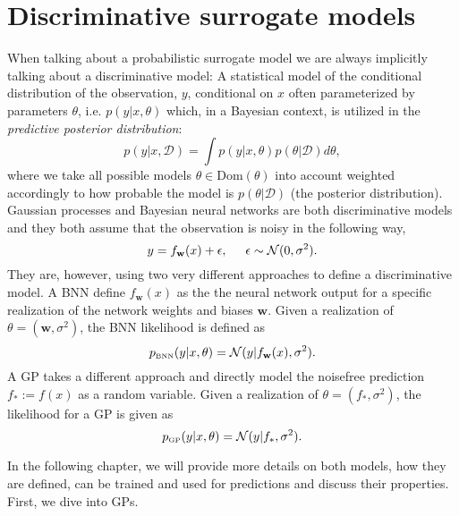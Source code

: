 \chapter{Discriminative surrogate models}

When talking about a probabilistic surrogate model we are always implicitly talking about a
discriminative model: A statistical model of the conditional distribution of the observation, $y$, 
conditional on $x$ often parameterized by parameters $\theta$, i.e. $p(y|x, \theta)$ 
which, in a Bayesian context, is utilized in the \textit{predictive posterior
distribution}:
\begin{equation}\label{predictive_posterior_dist}
    p(y|x,\mathcal{D}) = \int p(y|x, \theta)p(\theta|\mathcal{D}) d\theta, 
\end{equation}
where we take all
possible models $\theta \in \text{Dom}(\theta)$ into account weighted accordingly to how probable
the model is $p(\theta|\mathcal{D})$ (the posterior distribution). Gaussian processes and Bayesian
neural networks are both discriminative models and they both assume that the observation is noisy in the
following way, 
$$y = f_{\textbf{w}}(x) + \epsilon, \hspace*{0.5cm} \epsilon \sim \mathcal{N}(0, \sigma^2).$$ They
are, however, using two very different approaches to define a discriminative model. A BNN define
$f_{\textbf{w}}(x)$ as the the neural network output for a specific realization of the network
weights and biases $\textbf{w}$. Given a realization of $\theta = (\textbf{w}, \sigma^2)$, the BNN
likelihood is defined as
$$p_{\text{\tiny BNN}} (y|x, \theta) = \mathcal{N}(y| f_{\textbf{w}}(x),\sigma^2).$$
A GP takes a different approach and directly model the noisefree prediction $f_* := f(x)$ as a random
variable. Given a realization of $\theta = (f_*,\sigma^2)$, the likelihood for a GP is given as
\begin{equation}\label{GP_likelihood}
    p_{\text{\tiny GP}}(y|x, \theta) = \mathcal{N}(y| f_*,\sigma^2).
\end{equation}


In the following chapter, we will provide more details on both models, how they are defined, can be trained
and used for predictions and discuss their properties. First, we dive into GPs.


